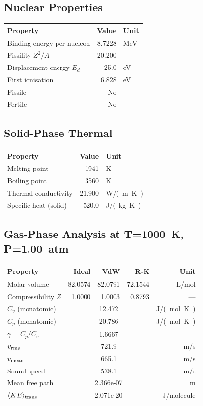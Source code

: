 \documentclass[11pt,a4paper]{article}
\begin{document}
\subsection{Nuclear Properties}
\begin{tabular}{lrl}
  \toprule
  Property & Value & Unit \\
  \midrule
  Binding energy per nucleon & 8.7228 & \si{MeV} \\
  Fissility $Z^2/A$ & 20.200 & --- \\
  Displacement energy $E_d$ & 25.0 & \si{eV} \\
  First ionisation & 6.828 & \si{eV} \\
  Fissile & No & --- \\
  Fertile & No & --- \\
  \bottomrule
\end{tabular}

\subsection{Solid-Phase Thermal}
\begin{tabular}{lrl}
  \toprule
  Property & Value & Unit \\
  \midrule
  Melting point & 1941 & \si{K} \\
  Boiling point & 3560 & \si{K} \\
  Thermal conductivity & 21.900 & \si{W/(m.K)} \\
  Specific heat (solid) & 520.0 & \si{J/(kg.K)} \\
  \bottomrule
\end{tabular}

\subsection{Gas-Phase Analysis at T=\SI{1000}{K}, P=\SI{1.00}{atm}}
\begin{tabular}{lrrrr}
  \toprule
  Property & Ideal & VdW & R-K & Unit \\
  \midrule
  Molar volume & 82.0574 & 82.0791 & 72.1544 & \si{L/mol} \\
  Compressibility $Z$ & 1.0000 & 1.0003 & 0.8793 & --- \\
  \midrule
  $C_v$ (monatomic) & \multicolumn{3}{c}{12.472} & \si{J/(mol.K)} \\
  $C_p$ (monatomic) & \multicolumn{3}{c}{20.786} & \si{J/(mol.K)} \\
  $\gamma = C_p/C_v$ & \multicolumn{3}{c}{1.6667} & --- \\
  $v_{\rm rms}$ & \multicolumn{3}{c}{721.9} & \si{m/s} \\
  $v_{\rm mean}$ & \multicolumn{3}{c}{665.1} & \si{m/s} \\
  Sound speed & \multicolumn{3}{c}{538.1} & \si{m/s} \\
  Mean free path & \multicolumn{3}{c}{2.366e-07} & \si{m} \\
  $\langle KE \rangle_{\rm trans}$ & \multicolumn{3}{c}{2.071e-20} & \si{J/molecule} \\
  \bottomrule
\end{tabular}
\end{document}
